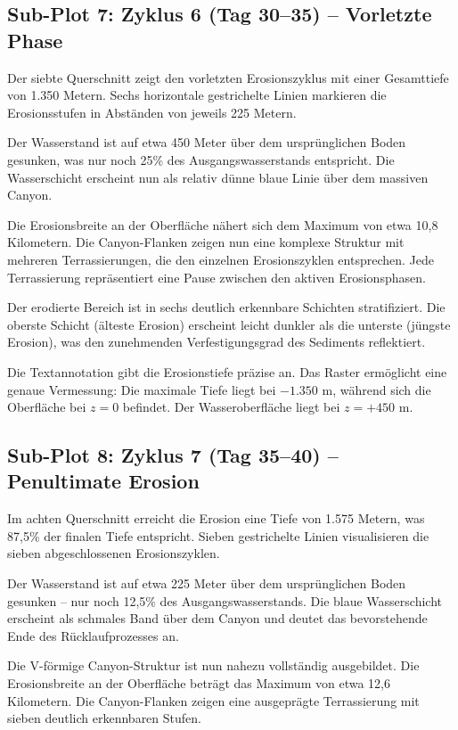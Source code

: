 ﻿\documentclass[12pt,a4paper]{report}
\begin{document}
\subsection{Sub-Plot 7: Zyklus 6 (Tag 30--35) -- Vorletzte Phase}

Der siebte Querschnitt zeigt den vorletzten Erosionszyklus mit einer Gesamttiefe von 1.350 Metern. Sechs horizontale gestrichelte Linien markieren die Erosionsstufen in Abständen von jeweils 225 Metern.

Der Wasserstand ist auf etwa 450 Meter über dem ursprünglichen Boden gesunken, was nur noch 25\% des Ausgangswasserstands entspricht. Die Wasserschicht erscheint nun als relativ dünne blaue Linie über dem massiven Canyon.

Die Erosionsbreite an der Oberfläche nähert sich dem Maximum von etwa 10,8 Kilometern. Die Canyon-Flanken zeigen nun eine komplexe Struktur mit mehreren Terrassierungen, die den einzelnen Erosionszyklen entsprechen. Jede Terrassierung repräsentiert eine Pause zwischen den aktiven Erosionsphasen.

Der erodierte Bereich ist in sechs deutlich erkennbare Schichten stratifiziert. Die oberste Schicht (älteste Erosion) erscheint leicht dunkler als die unterste (jüngste Erosion), was den zunehmenden Verfestigungsgrad des Sediments reflektiert.

Die Textannotation gibt die Erosionstiefe präzise an. Das Raster ermöglicht eine genaue Vermessung: Die maximale Tiefe liegt bei $-1.350$ m, während sich die Oberfläche bei $z = 0$ befindet. Der Wasseroberfläche liegt bei $z = +450$ m.

\subsection{Sub-Plot 8: Zyklus 7 (Tag 35--40) -- Penultimate Erosion}

Im achten Querschnitt erreicht die Erosion eine Tiefe von 1.575 Metern, was 87,5\% der finalen Tiefe entspricht. Sieben gestrichelte Linien visualisieren die sieben abgeschlossenen Erosionszyklen.

Der Wasserstand ist auf etwa 225 Meter über dem ursprünglichen Boden gesunken -- nur noch 12,5\% des Ausgangswasserstands. Die blaue Wasserschicht erscheint als schmales Band über dem Canyon und deutet das bevorstehende Ende des Rücklaufprozesses an.

Die V-förmige Canyon-Struktur ist nun nahezu vollständig ausgebildet. Die Erosionsbreite an der Oberfläche beträgt das Maximum von etwa 12,6 Kilometern. Die Canyon-Flanken zeigen eine ausgeprägte Terrassierung mit sieben deutlich erkennbaren Stufen.
\end{document}
